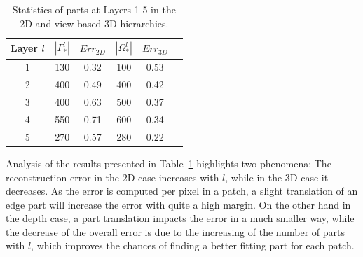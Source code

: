 \documentclass[runningheads]{llncs}
\begin{document}
 \begin{table}
 \begin{center}
  \begin{tabular}{ | c | c | c | c | c |r |}
      \hline
      Layer $l$  & $|\Gamma_*^l|$ & $Err_{2D}$ &  $|\Omega_*^l|$ & $Err_{3D}$ \\ \hline
    1 &  130 & 0.32 & 100 & 0.53 \\ \hline
    2 &  400 & 0.49 & 400 & 0.42 \\ \hline
    3 &  400 & 0.63 & 500 & 0.37  \\ \hline 
    4 &  550 & 0.71 & 600 & 0.34  \\ \hline
    5 &  270 & 0.57 & 280 & 0.22 \\ \hline
  \end{tabular}
\end{center}
 \caption{Statistics of parts at Layers 1-5 in the 2D and view-based 3D hierarchies.}
 \label{tab:stats}
\end{table}


Analysis of the results presented in Table~\ref{tab:stats} highlights two phenomena: The reconstruction error in the 2D case increases with $l$, while in the 3D case it decreases. As the error is computed per pixel in a patch, a slight translation of an edge part will increase the error with quite a high margin. On the other hand in the depth case, a part translation impacts the error in a much smaller way, while the decrease of the overall error is due to the increasing of the number of parts with $l$, which improves the chances of finding a better fitting part for each patch. 

%
\end{document}
